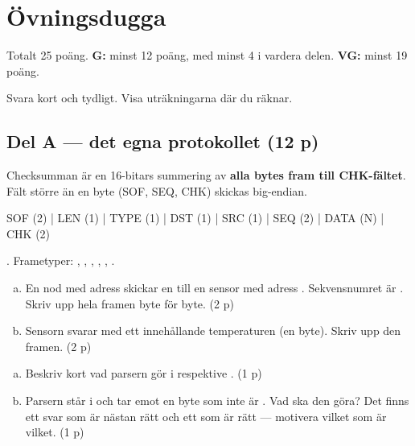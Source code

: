 \chapter{Övningsdugga}
\label{ch:ovningsdugga}

\noindent Totalt 25 poäng. \textbf{G:} minst 12 poäng, med minst 4 i vardera delen.
\textbf{VG:} minst 19 poäng.

\bigskip
\noindent Svara kort och tydligt. Visa uträkningarna där du räknar.

\section*{Del A --- det egna protokollet (12 p)}

Checksumman är en 16-bitars summering av \textbf{alla bytes fram till CHK-fältet}. Fält större än
en byte (SOF, SEQ, CHK) skickas big-endian.

\begin{console}
SOF (2) | LEN (1) | TYPE (1) | DST (1) | SRC (1) | SEQ (2) | DATA (N) | CHK (2)
\end{console}

\noindent {}. Frametyper: , ,
, , , .

\label{ex:d:1}
\begin{enumerate}[a)]
  \item En nod med adress  skickar en  till en sensor med adress
    . Sekvensnumret är . Skriv upp hela framen byte för byte. (2 p)
  \item Sensorn svarar med ett  innehållande temperaturen 
    (en byte). Skriv upp den framen. (2 p)
\end{enumerate}

\label{ex:d:2}
\begin{enumerate}[a)]
  \item Beskriv kort vad parsern gör i  respektive . (1 p)
  \item Parsern står i  och tar emot en byte som inte är . Vad ska
    den göra? Det finns ett svar som är nästan rätt och ett som är rätt --- motivera vilket som är
    vilket. (1 p)
\end{enumerate}

